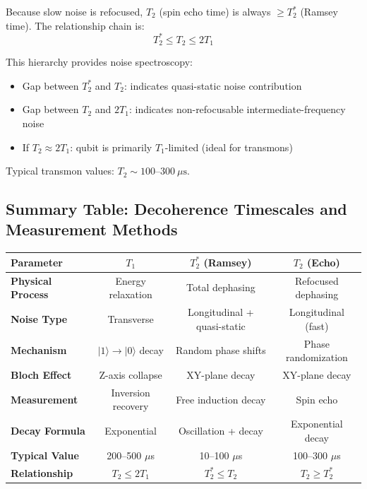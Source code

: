 \documentclass{article}
\begin{document}
Because slow noise is refocused, $T_2$ (spin echo time) is always $\geq T_2^*$ (Ramsey time). The relationship chain is:
$$T_2^* \leq T_2 \leq 2T_1$$

This hierarchy provides noise spectroscopy:
\begin{itemize}
    \item Gap between $T_2^*$ and $T_2$: indicates quasi-static noise contribution
    \item Gap between $T_2$ and $2T_1$: indicates non-refocusable intermediate-frequency noise
    \item If $T_2 \approx 2T_1$: qubit is primarily $T_1$-limited (ideal for transmons)
\end{itemize}

Typical transmon values: $T_2 \sim 100$--$300~\mu\text{s}$.

\subsection{Summary Table: Decoherence Timescales and Measurement Methods}

\begin{center}
\begin{tabular}{|l|c|c|c|}
\hline
\textbf{Parameter} & \textbf{$T_1$} & \textbf{$T_2^*$ (Ramsey)} & \textbf{$T_2$ (Echo)} \\
\hline
\textbf{Physical Process} & Energy relaxation & Total dephasing & Refocused dephasing \\
\hline
\textbf{Noise Type} & Transverse & Longitudinal + quasi-static & Longitudinal (fast) \\
\hline
\textbf{Mechanism} & $|1\rangle \to |0\rangle$ decay & Random phase shifts & Phase randomization \\
\hline
\textbf{Bloch Effect} & Z-axis collapse & XY-plane decay & XY-plane decay \\
\hline
\textbf{Measurement} & Inversion recovery & Free induction decay & Spin echo \\
\hline
\textbf{Decay Formula} & Exponential & Oscillation + decay & Exponential decay \\
\hline
\textbf{Typical Value} & 200--500 $\mu$s & 10--100 $\mu$s & 100--300 $\mu$s \\
\hline
\textbf{Relationship} & $T_2 \leq 2T_1$ & $T_2^* \leq T_2$ & $T_2 \geq T_2^*$ \\
\hline
\end{tabular}
\end{center}
\end{document}
